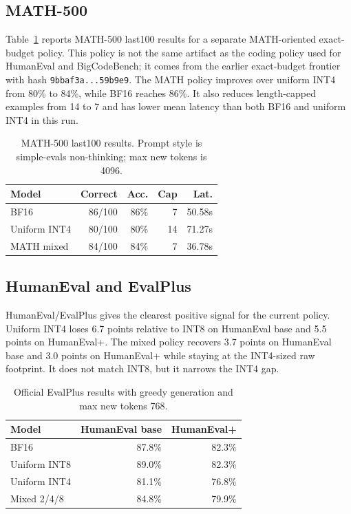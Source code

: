 \documentclass{article}
\begin{document}
\subsection{MATH-500}

Table~\ref{tab:math500} reports MATH-500 last100 results for a separate MATH-oriented exact-budget policy. This policy is not the same artifact as the coding policy used for HumanEval and BigCodeBench; it comes from the earlier exact-budget frontier with hash \texttt{9bbaf3a...59b9e9}. The MATH policy improves over uniform INT4 from 80\% to 84\%, while BF16 reaches 86\%. It also reduces length-capped examples from 14 to 7 and has lower mean latency than both BF16 and uniform INT4 in this run.

\begin{table}[t]
\caption{MATH-500 last100 results. Prompt style is simple-evals non-thinking; max new tokens is 4096.}
\label{tab:math500}
\centering
\footnotesize
\begin{tabular}{lrrrr}
\toprule
Model & Correct & Acc. & Cap & Lat. \\
\midrule
BF16 & 86/100 & 86\% & 7 & 50.58s \\
Uniform INT4 & 80/100 & 80\% & 14 & 71.27s \\
MATH mixed & 84/100 & 84\% & 7 & 36.78s \\
\bottomrule
\end{tabular}
\end{table}

\subsection{HumanEval and EvalPlus}

HumanEval/EvalPlus gives the clearest positive signal for the current policy. Uniform INT4 loses 6.7 points relative to INT8 on HumanEval base and 5.5 points on HumanEval+. The mixed policy recovers 3.7 points on HumanEval base and 3.0 points on HumanEval+ while staying at the INT4-sized raw footprint. It does not match INT8, but it narrows the INT4 gap.

\begin{table}[t]
\caption{Official EvalPlus results with greedy generation and max new tokens 768.}
\label{tab:evalplus}
\centering
\begin{tabular}{lrr}
\toprule
Model & HumanEval base & HumanEval+ \\
\midrule
BF16 & 87.8\% & 82.3\% \\
Uniform INT8 & 89.0\% & 82.3\% \\
Uniform INT4 & 81.1\% & 76.8\% \\
Mixed 2/4/8 & 84.8\% & 79.9\% \\
\bottomrule
\end{tabular}
\end{table}
\end{document}
